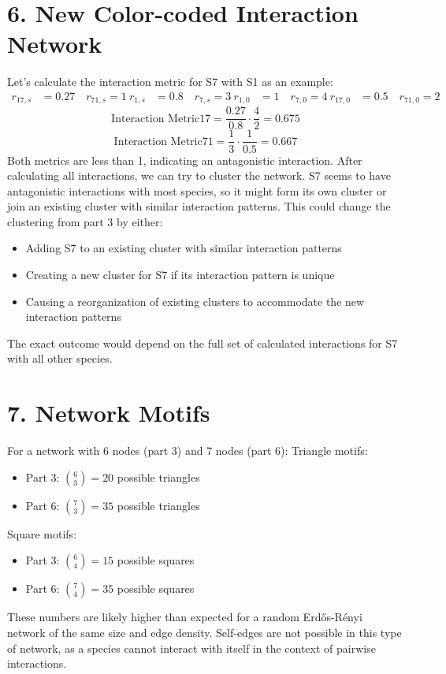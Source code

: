 \documentclass{article}
\begin{document}
\section*{6. New Color-coded Interaction Network}
Let's calculate the interaction metric for S7 with S1 as an example:
\begin{align*}
r_{17,s} &= 0.27 \quad r_{71,s} = 1 \
r_{1,s} &= 0.8 \quad r_{7,s} = 3 \
r_{1,0} &= 1 \quad r_{7,0} = 4 \
r_{17,0} &= 0.5 \quad r_{71,0} = 2
\end{align*}
\[ \text{Interaction Metric}{17} = \frac{0.27}{0.8} \cdot \frac{4}{2} = 0.675 \]
\[ \text{Interaction Metric}{71} = \frac{1}{3} \cdot \frac{1}{0.5} = 0.667 \]
Both metrics are less than 1, indicating an antagonistic interaction.
After calculating all interactions, we can try to cluster the network. S7 seems to have antagonistic interactions with most species, so it might form its own cluster or join an existing cluster with similar interaction patterns.
This could change the clustering from part 3 by either:
\begin{itemize}
\item Adding S7 to an existing cluster with similar interaction patterns
\item Creating a new cluster for S7 if its interaction pattern is unique
\item Causing a reorganization of existing clusters to accommodate the new interaction patterns
\end{itemize}
The exact outcome would depend on the full set of calculated interactions for S7 with all other species.

\section*{7. Network Motifs}
For a network with 6 nodes (part 3) and 7 nodes (part 6):
Triangle motifs:
\begin{itemize}
\item Part 3: $\binom{6}{3} = 20$ possible triangles
\item Part 6: $\binom{7}{3} = 35$ possible triangles
\end{itemize}
Square motifs:
\begin{itemize}
\item Part 3: $\binom{6}{4} = 15$ possible squares
\item Part 6: $\binom{7}{4} = 35$ possible squares
\end{itemize}
These numbers are likely higher than expected for a random Erdős-Rényi network of the same size and edge density.
Self-edges are not possible in this type of network, as a species cannot interact with itself in the context of pairwise interactions.
\end{document}

